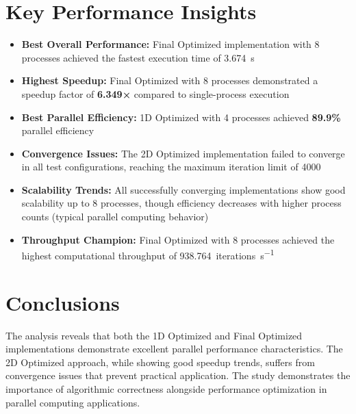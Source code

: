 \documentclass[11pt]{article}
\begin{document}
\section{Key Performance Insights}

\begin{itemize}
\item \textbf{Best Overall Performance:} Final Optimized implementation with 8 processes achieved the fastest execution time of \SI{3.674}{\second}

\item \textbf{Highest Speedup:} Final Optimized with 8 processes demonstrated a speedup factor of \textbf{6.349×} compared to single-process execution

\item \textbf{Best Parallel Efficiency:} 1D Optimized with 4 processes achieved \textbf{89.9\%} parallel efficiency

\item \textbf{Convergence Issues:} The 2D Optimized implementation failed to converge in all test configurations, reaching the maximum iteration limit of 4000

\item \textbf{Scalability Trends:} All successfully converging implementations show good scalability up to 8 processes, though efficiency decreases with higher process counts (typical parallel computing behavior)

\item \textbf{Throughput Champion:} Final Optimized with 8 processes achieved the highest computational throughput of \SI{938.764}{iterations\per\second}
\end{itemize}

\section{Conclusions}

The analysis reveals that both the 1D Optimized and Final Optimized implementations demonstrate excellent parallel performance characteristics. The 2D Optimized approach, while showing good speedup trends, suffers from convergence issues that prevent practical application. The study demonstrates the importance of algorithmic correctness alongside performance optimization in parallel computing applications.




 
\end{document}
